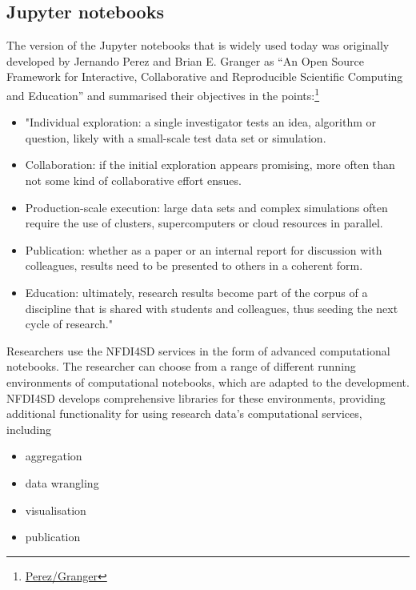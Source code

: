 \documentclass[
  english,
  paper=a4,
  oneside,captions=tableheading
]{scrbook}
\providecommand{\tightlist}{%
  \setlength{\itemsep}{0pt}\setlength{\parskip}{0pt}}
\renewenvironment{quote}{\begin{customblockquote}\list{}{\rightmargin=0em\leftmargin=0em}%
\item\relax\color{blockquote-text}\ignorespaces}{\unskip\unskip\endlist\end{customblockquote}}
\begin{document}
\hypertarget{jupyter-notebooks}{%
\subsection{Jupyter notebooks}\label{jupyter-notebooks}}

The version of the Jupyter notebooks that is widely used today was
originally developed by Jernando Perez and Brian E. Granger as ``An Open
Source Framework for Interactive, Collaborative and Reproducible
Scientific Computing and Education'' and summarised their objectives in
the points:\footnote{\href{https://ipython.org/_static/sloangrant/sloan-grant.html}{Perez/Granger}}

\begin{quote}
\begin{itemize}
\tightlist
\item
  "Individual exploration: a single investigator tests an idea,
  algorithm or question, likely with a small-scale test data set or
  simulation.
\item
  Collaboration: if the initial exploration appears promising, more
  often than not some kind of collaborative effort ensues.
\item
  Production-scale execution: large data sets and complex simulations
  often require the use of clusters, supercomputers or cloud resources
  in parallel.
\item
  Publication: whether as a paper or an internal report for discussion
  with colleagues, results need to be presented to others in a coherent
  form.
\item
  Education: ultimately, research results become part of the corpus of a
  discipline that is shared with students and colleagues, thus seeding
  the next cycle of research."
\end{itemize}
\end{quote}

Researchers use the NFDI4SD services in the form of advanced
computational notebooks. The researcher can choose from a range of
different running environments of computational notebooks, which are
adapted to the development. NFDI4SD develops comprehensive libraries for
these environments, providing additional functionality for using
research data's computational services, including

\begin{itemize}
\tightlist
\item
  aggregation
\item
  data wrangling
\item
  visualisation
\item
  publication
\end{itemize}
\end{document}
